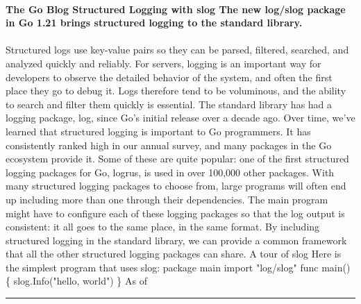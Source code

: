 \documentclass[10pt,a4paper]{article}
\begin{document}
\begin{multicols*}{2}
\paragraph{}
\textbf{The Go Blog
Structured Logging with slog
The new
log/slog package in Go 1.21 brings structured logging to the standard
library.}
\paragraph{}
 Structured logs use key-value pairs so they can be parsed, filtered,
searched, and analyzed quickly and reliably.
For servers, logging is an important way for developers to
observe the detailed behavior of the system, and often the first place they go
to debug it. Logs therefore tend to be voluminous, and the ability to search and
filter them quickly is essential.
The standard library has had a logging package,
log,
since Go’s initial release over a decade ago.
Over time,
we’ve learned that structured logging is important to Go programmers. It has
consistently ranked high in our annual survey, and many packages in the Go
ecosystem provide it. Some of these are quite popular: one of the first structured
logging packages for Go, logrus,
is used in over 100,000 other packages.
With many structured logging packages to choose from, large programs will often end up including more than one through their dependencies. The main program might have to configure each of these logging packages so that the log output is consistent: it all goes to the same place, in the same format. By including structured logging in the standard library, we can provide a common framework that all the other structured logging packages can share.
A tour of
slog
Here is the simplest program that uses
slog:
package main import "log/slog" func main() \{ slog.Info("hello, world") \}
As of
\par\noindent\textcolor{red}{\rule{\linewidth}{0.2mm}}
\vfill
\null
\noindent\begin{minipage}{\linewidth}

\end{minipage}
\end{multicols*}
\end{document}
